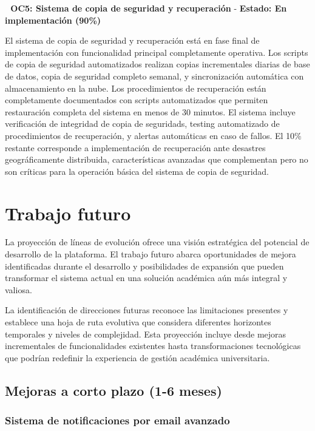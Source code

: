 \documentclass[12pt,a4paper,oneside]{report}
\begin{document}
\textbf{🔄 OC5: Sistema de copia de seguridad y recuperación} - \textbf{Estado: En implementación (90\%)}

El sistema de copia de seguridad y recuperación está en fase final de implementación con funcionalidad principal completamente operativa. Los scripts de copia de seguridad automatizados realizan copias incrementales diarias de base de datos, copia de seguridad completo semanal, y sincronización automática con almacenamiento en la nube. Los procedimientos de recuperación están completamente documentados con scripts automatizados que permiten restauración completa del sistema en menos de 30 minutos. El sistema incluye verificación de integridad de copia de seguridads, testing automatizado de procedimientos de recuperación, y alertas automáticas en caso de fallos. El 10\% restante corresponde a implementación de recuperación ante desastres geográficamente distribuida, características avanzadas que complementan pero no son críticas para la operación básica del sistema de copia de seguridad.

\section{Trabajo futuro}\label{trabajo-futuro}

La proyección de líneas de evolución ofrece una visión estratégica del potencial de desarrollo de la plataforma. El trabajo futuro abarca oportunidades de mejora identificadas durante el desarrollo y posibilidades de expansión que pueden transformar el sistema actual en una solución académica aún más integral y valiosa.

La identificación de direcciones futuras reconoce las limitaciones presentes y establece una hoja de ruta evolutiva que considera diferentes horizontes temporales y niveles de complejidad. Esta proyección incluye desde mejoras incrementales de funcionalidades existentes hasta transformaciones tecnológicas que podrían redefinir la experiencia de gestión académica universitaria.

\subsection{Mejoras a corto plazo (1-6
meses)}\label{mejoras-a-corto-plazo-1-6-meses}

\subsubsection{Sistema de notificaciones por email
avanzado}\label{sistema-de-notificaciones-por-email-avanzado}
\end{document}
